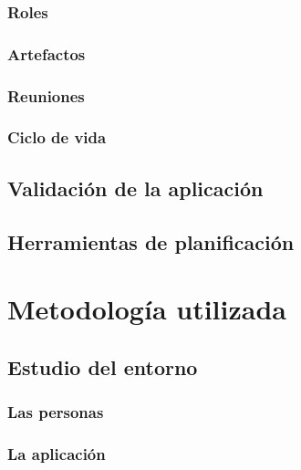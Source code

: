 \documentclass{iccmemoria}
\begin{document}
		\subsection{Roles}
		

		\subsection{Artefactos}
		\label{sec:Artefactos}
		
		
		\subsection{Reuniones}
		
		
		\subsection{Ciclo de vida}
		

	\section{Validación de la aplicación}
		

	\section{Herramientas de planificación}
		
	
\chapter{Metodología utilizada}


	\section{Estudio del entorno}
	

		\subsection{Las personas}
		

		\subsection{La aplicación}
		
\end{document}
